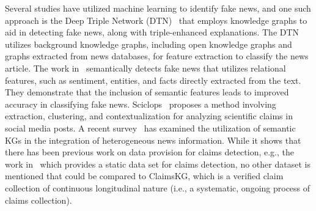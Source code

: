 \documentclass[
]{ceurart}
\begin{document}
Several studies have utilized machine learning to identify fake news, and one such approach is the Deep Triple Network (DTN)~\cite{LIU2021100646} that employs knowledge graphs to aid in detecting fake news, along with triple-enhanced explanations. The DTN utilizes background knowledge graphs, including open knowledge graphs and graphs extracted from news databases, for feature extraction to classify the news article. The work in~\cite{inbook} semantically detects fake news that utilizes relational features, such as sentiment, entities, and facts directly extracted from the text. They demonstrate that the inclusion of semantic features leads to improved accuracy in classifying fake news. Sciclops~\cite{smeros2021sciclops} proposes a method involving extraction, clustering, and contextualization for analyzing scientific claims in social media posts. A recent survey~\cite{opdahl2022semantic} has examined the utilization of semantic KGs in the integration of heterogeneous news information. While it shows that there has been previous work on data provision for claims detection, e.g., the work in~\cite{shaar-etal-2020-known} which provides a static data set for claims detection, no other dataset is mentioned that could be compared to ClaimsKG, which is a verified claim collection of continuous longitudinal nature  (i.e., a systematic, ongoing process of claims collection).
\end{document}
